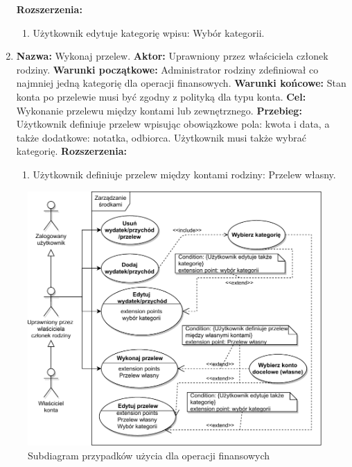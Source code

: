 \begin{enumerate}[labelwidth=1em,label=\arabic*.]
    \textbf{Rozszerzenia: } 
    \begin{enumerate}[label=\alph*)]
        \item Użytkownik edytuje kategorię wpisu: Wybór kategorii.
    \end{enumerate}
\item \textbf{Nazwa:} Wykonaj przelew. \newline
    \textbf{Aktor:} Uprawniony przez właściciela członek rodziny. \newline
    \textbf{Warunki początkowe:} Administrator rodziny zdefiniował co najmniej jedną kategorię dla operacji finansowych. \newline
    \textbf{Warunki końcowe:} Stan konta po przelewie musi być zgodny z polityką dla typu konta. \newline
    \textbf{Cel:} Wykonanie przelewu między kontami lub zewnętrznego. \newline
    \textbf{Przebieg:} Użytkownik definiuje przelew wpisując obowiązkowe pola: kwota i data, a także dodatkowe: notatka, odbiorca. Użytkownik musi także wybrać kategorię. \newline
    \textbf{Rozszerzenia: }
    \begin{enumerate}[label=\alph*)]
        \item Użytkownik definiuje przelew między kontami rodziny: Przelew własny.
    \end{enumerate}
\end{enumerate}

\begin{figure}[t]
	\centering
	\includegraphics[width=.7\linewidth]{rys03/use-case-money-2.pdf}
	\caption{Subdiagram przypadków użycia dla operacji finansowych}
	\label{fig:use-case-money}
\end{figure}

